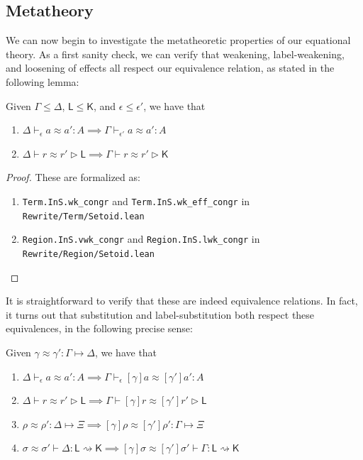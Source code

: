 \documentclass[acmsmall,screen,review]{acmart}
\newcommand{\ms}[1]{\ensuremath{\mathsf{#1}}}
\newcommand{\issubst}[3]{#1: #2 \mapsto #3}
\newcommand{\lbsubst}[4]{#1 \vdash #2: #3 \rightsquigarrow #4}
\newcommand{\teqv}{\approx}
\newcommand{\tmeq}[5]{#1 \vdash_{#2} #3 \teqv #4 : {#5}}
\newcommand{\lbeq}[4]{#1 \vdash #2 \teqv #3 \rhd {#4}}
\newcommand{\tmseq}[4]{\issubst{#1 \teqv #2}{#3}{#4}}
\newcommand{\lbseq}[5]{\lbsubst{#1 \teqv #2}{#3}{#4}{#5}}
\begin{document}
\subsection{Metatheory}

We can now begin to investigate the metatheoretic properties of our equational theory. As a first
sanity check, we can verify that weakening, label-weakening, and loosening of effects all respect
our equivalence relation, as stated in the following lemma:
\begin{lemma}
  Given $\Gamma \leq \Delta$, $\ms{L} \leq \ms{K}$, and $\epsilon \leq \epsilon'$, we have that
  \begin{enumerate}[label=(\alph*)]
    \item $\tmeq{\Delta}{\epsilon}{a}{a'}{A} \implies \tmeq{\Gamma}{\epsilon'}{a}{a'}{A}$
    \item $\lbeq{\Delta}{r}{r'}{\ms{L}} \implies \lbeq{\Gamma}{r}{r'}{\ms{K}}$
  \end{enumerate}
\end{lemma}
\begin{proof}
  These are formalized as:
  \begin{enumerate}[label=(\alph*)]
    \item \texttt{Term.InS.wk_congr} and \texttt{Term.InS.wk_eff_congr} in 
    \texttt{Rewrite/Term/Setoid.lean}
    \item \texttt{Region.InS.vwk_congr} and \texttt{Region.InS.lwk_congr} in
    \texttt{Rewrite/Region/Setoid.lean}
  \end{enumerate}
\end{proof} 
It is straightforward to verify that these are indeed equivalence relations.  In fact, it turns out
that substitution and label-substitution both respect these equivalences, in the following precise
sense:
\begin{lemma}
  Given $\tmseq{\gamma}{\gamma'}{\Gamma}{\Delta}$, we have that
  \begin{enumerate}[label=(\alph*)]
    \item $\tmeq{\Delta}{\epsilon}{a}{a'}{A}
      \implies \tmeq{\Gamma}{\epsilon}{[\gamma]a}{[\gamma']a'}{A}$
    \item $\lbeq{\Delta}{r}{r'}{\ms{L}} 
      \implies \lbeq{\Gamma}{[\gamma]r}{[\gamma']r'}{\ms{L}}$
    \item $\tmseq{\rho}{\rho'}{\Delta}{\Xi}
      \implies \tmseq{[\gamma]\rho}{[\gamma']\rho'}{\Gamma}{\Xi}$
    \item $\lbseq{\sigma}{\sigma'}{\Delta}{\ms{L}}{\ms{K}}
      \implies \lbseq{[\gamma]\sigma}{[\gamma']\sigma'}{\Gamma}{\ms{L}}{\ms{K}}$
  \end{enumerate}
\end{lemma}
\end{document}
